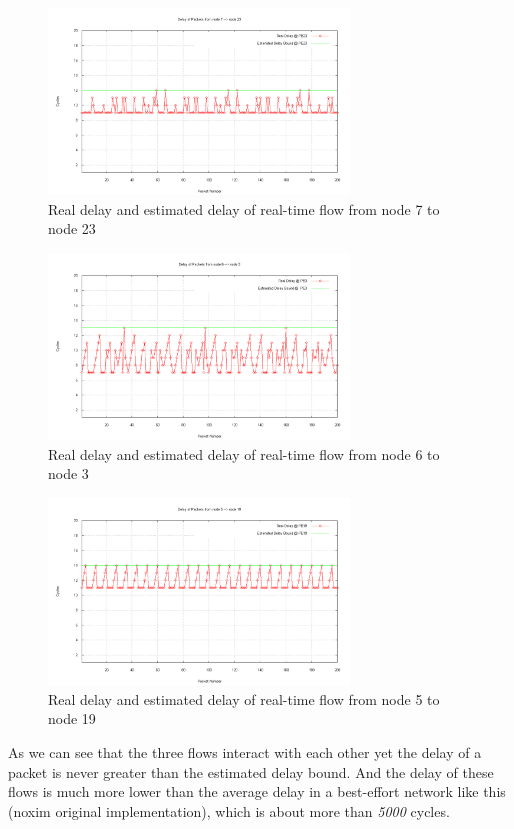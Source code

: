 \documentclass[conference, twocolumn]{IEEEtran}
\theoremstyle{definition}
\begin{document}
\begin{figure}[htp]
\centering
\includegraphics[width=8cm]{pics/PE23.png}
\caption[Flow from node 7 to node 23.]
{Real delay and estimated delay of real-time flow from node
7 to node 23}\label{fig:PE7PE23}
\end{figure}

\begin{figure}[htp]
\centering
\includegraphics[width=8cm]{pics/PE3.png}
\caption[Three flows example.]
{Real delay and estimated delay of real-time flow from node
6 to node 3}\label{fig:PE6PE3}
\end{figure}

\begin{figure}[htp]
\centering
\includegraphics[width=8cm]{pics/PE19.png}
\caption[Three flows example.]
{Real delay and estimated delay of real-time flow from node
5 to node 19}\label{fig:PE5PE19}
\end{figure}

As we can see that the three flows interact with each other yet the delay of a
packet is never greater than the estimated delay bound. And the delay of these
flows is much more lower than the average delay in a best-effort network like
this (noxim original implementation), which is about more than {\em 5000}
cycles.



\end{document}
